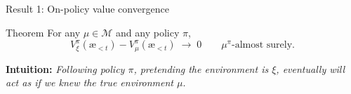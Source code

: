 \documentclass[10pt,aspectratio=169]{beamer}
\newcommand{\cM}{\mathcal{M}}
\newcommand{\aes}{{\text{\ae}}}            %
\begin{document}

\begin{frame}{Result 1: On-policy value convergence}
\begin{block}{Theorem}
For any $\mu\in\cM$ and any policy $\pi$,
\[
V_\xi^\pi(\aes_{<t}) - V_\mu^\pi(\aes_{<t}) \;\to\; 0 \qquad \mu^\pi\text{-almost surely}.
\]
\end{block}
\textbf{Intuition:} \emph{Following policy $\pi$, pretending the environment is $\xi$, 
eventually will act as if we knew the true environment $\mu$}.
\end{frame}
\end{document}
